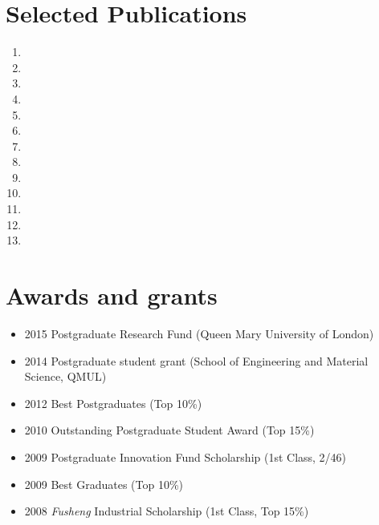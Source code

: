 \documentclass[letterpaper]{article}
\def\name{Dr Yang Wang}
\begin{document}
\vspace{-12pt}
\section*{Selected Publications}
\vspace{-10pt}





\begin{enumerate}
\item {}
\item{}
\item {}
\item {}
\item {}
\item {}
\item {}
\item {}
\item {}
\item {}
\item {}
\item {}
\item {}

\end{enumerate}


\vspace{-12pt}
\section*{Awards and grants}
\vspace{-10pt}
\begin{itemize}
\item 2015 Postgraduate Research Fund (Queen Mary University of London)
\item 2014 Postgraduate student grant (School of Engineering and Material Science, QMUL)
\item 2012 Best Postgraduates (Top 10\%)
\item 2010 Outstanding Postgraduate Student Award (Top 15\%)
\item 2009 Postgraduate Innovation Fund Scholarship (1st Class, 2/46)
\item 2009 Best Graduates (Top 10\%)
\item 2008 \textsl{Fusheng} Industrial Scholarship (1st Class, Top 15\%)
\end{itemize}
\end{document}
